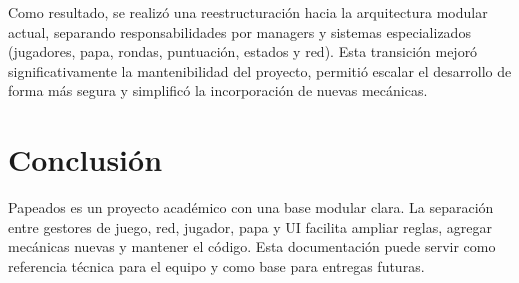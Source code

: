 \documentclass[11pt,a4paper]{article}
\begin{document}
Como resultado, se realizó una reestructuración hacia la arquitectura modular actual, separando responsabilidades por managers y sistemas especializados (jugadores, papa, rondas, puntuación, estados y red). Esta transición mejoró significativamente la mantenibilidad del proyecto, permitió escalar el desarrollo de forma más segura y simplificó la incorporación de nuevas mecánicas.

\section{Conclusión}
Papeados es un proyecto académico con una base modular clara. La separación entre gestores de juego, red, jugador, papa y UI facilita ampliar reglas, agregar mecánicas nuevas y mantener el código. Esta documentación puede servir como referencia técnica para el equipo y como base para entregas futuras.
\end{document}
